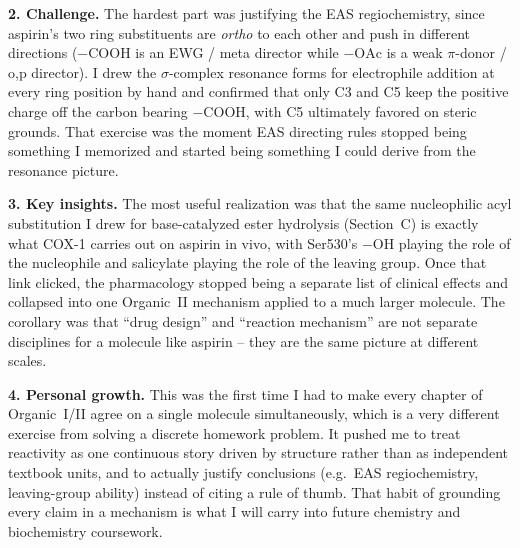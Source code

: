 \documentclass[9pt]{extarticle}
\begin{document}
\textbf{2. Challenge.}
The hardest part was justifying the EAS regiochemistry, since
aspirin's two ring substituents are \emph{ortho} to each other and
push in different directions ($-\mathrm{COOH}$ is an EWG / meta
director while $-\mathrm{OAc}$ is a weak $\pi$-donor / o,p director).
I drew the $\sigma$-complex resonance forms for electrophile addition
at every ring position by hand and confirmed that only C3 and C5 keep
the positive charge off the carbon bearing $-\mathrm{COOH}$, with C5
ultimately favored on steric grounds. That exercise was the moment
EAS directing rules stopped being something I memorized and started
being something I could derive from the resonance picture.

\textbf{3. Key insights.}
The most useful realization was that the same nucleophilic acyl
substitution I drew for base-catalyzed ester hydrolysis (Section~C)
is exactly what COX-1 carries out on aspirin in vivo, with Ser530's
$-\mathrm{OH}$ playing the role of the nucleophile and salicylate
playing the role of the leaving group. Once that link clicked, the
pharmacology stopped being a separate list of clinical effects and
collapsed into one Organic~II mechanism applied to a much larger
molecule. The corollary was that ``drug design'' and ``reaction
mechanism'' are not separate disciplines for a molecule like aspirin
-- they are the same picture at different scales.

\textbf{4. Personal growth.}
This was the first time I had to make every chapter of Organic~I/II
agree on a single molecule simultaneously, which is a very different
exercise from solving a discrete homework problem. It pushed me to
treat reactivity as one continuous story driven by structure rather
than as independent textbook units, and to actually justify
conclusions (e.g.\ EAS regiochemistry, leaving-group ability) instead
of citing a rule of thumb. That habit of grounding every claim in a
mechanism is what I will carry into future chemistry and biochemistry
coursework.
\end{document}
